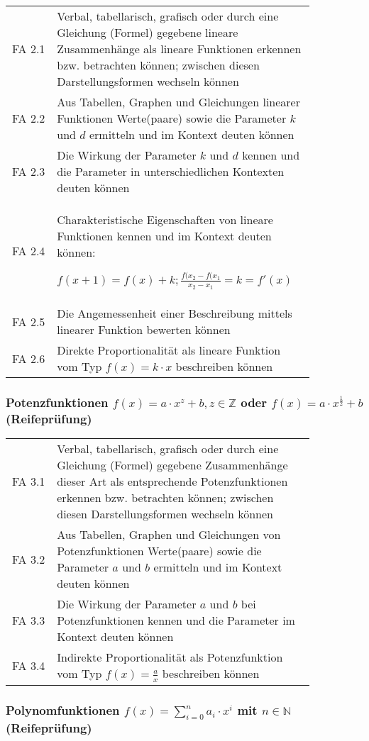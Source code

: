 \documentclass[a4paper,12pt]{article}
\begin{document}
\begin{tabular}{cp{0.85\linewidth}}
FA 2.1 & Verbal, tabellarisch, grafisch oder durch eine Gleichung (Formel) gegebene lineare Zusammenhänge als lineare Funktionen erkennen bzw. betrachten können; zwischen diesen Darstellungsformen wechseln können \\
FA 2.2 & Aus Tabellen, Graphen und Gleichungen linearer Funktionen Werte(paare) sowie die Parameter $k$ und $d$ ermitteln und im Kontext deuten können \\
FA 2.3 & Die Wirkung der Parameter $k$ und $d$ kennen und die Parameter in unterschiedlichen Kontexten deuten können\\
FA 2.4 & Charakteristische Eigenschaften von lineare Funktionen kennen und im Kontext deuten können:

$f(x+1)=f(x)+k; \frac{f(x_2-f(x_1}{x_2-x_1}=k=f'(x)$ \\
FA 2.5 & Die Angemessenheit einer Beschreibung mittels linearer Funktion bewerten können\\
FA 2.6 & Direkte Proportionalität als lineare Funktion vom Typ $f(x) = k\cdot x$ beschreiben können\\
\end{tabular}

\subsubsection{Potenzfunktionen $f(x)=a \cdot x^z + b, z\in \mathbb{Z}$ oder $f(x)=a\cdot x^{\frac{1}{2}}+b$ (Reifeprüfung)}

\begin{tabular}{cp{0.85\linewidth}}
FA 3.1 & Verbal, tabellarisch, grafisch oder durch eine Gleichung (Formel) gegebene Zusammenhänge dieser Art als entsprechende Potenzfunktionen erkennen bzw. betrachten können; zwischen diesen Darstellungsformen wechseln können \\
FA 3.2 & Aus Tabellen, Graphen und Gleichungen von Potenzfunktionen Werte(paare) sowie die Parameter $a$ und $b$ ermitteln und im Kontext deuten können \\
FA 3.3 & Die Wirkung der Parameter $a$ und $b$ bei Potenzfunktionen kennen und die Parameter im Kontext deuten können\\
FA 3.4 & Indirekte Proportionalität als Potenzfunktion vom Typ $f(x)=\frac{a}{x}$ beschreiben können
\end{tabular}

\subsubsection{Polynomfunktionen $f(x)=\sum_{i=0}^n a_i \cdot x^i$ mit $n \in \mathbb{N}$ (Reifeprüfung)}
\end{document}
